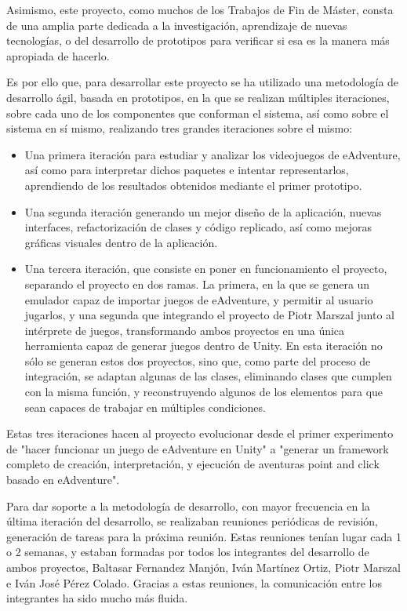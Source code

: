 Asimismo, este proyecto, como muchos de los Trabajos de Fin de Máster, consta de una amplia parte dedicada a la investigación, aprendizaje de nuevas tecnologías, o del desarrollo de prototipos para verificar si esa es la manera más apropiada de hacerlo.

Es por ello que, para desarrollar este proyecto se ha utilizado una metodología de desarrollo ágil, basada en prototipos, en la que se realizan múltiples iteraciones, sobre cada uno de los componentes que conforman el sistema, así como sobre el sistema en sí mismo, realizando tres grandes iteraciones sobre el mismo: 

\begin{itemize}
	\item 
	Una primera iteración para estudiar y analizar los videojuegos de eAdventure, así como para interpretar dichos paquetes e intentar representarlos, aprendiendo de los resultados obtenidos mediante el primer prototipo. 
	\item
	Una segunda iteración generando un mejor diseño de la aplicación, nuevas interfaces, refactorización de clases y código replicado, así como mejoras gráficas visuales dentro de la aplicación.
	\item
	Una tercera iteración, que consiste en poner en funcionamiento el proyecto, separando el proyecto en dos ramas. La primera, en la que se genera un emulador capaz de importar juegos de eAdventure, y permitir al usuario jugarlos, y una segunda que integrando el proyecto de Piotr Marszal junto al intérprete de juegos, transformando ambos proyectos en una única herramienta capaz de generar juegos dentro de Unity. En esta iteración no sólo se generan estos dos proyectos, sino que, como parte del proceso de integración, se adaptan algunas de las clases, eliminando clases que cumplen con la misma función, y reconstruyendo algunos de los elementos para que sean capaces de trabajar en múltiples condiciones.
\end{itemize}

Estas tres iteraciones hacen al proyecto evolucionar desde el primer experimento de "hacer funcionar un juego de eAdventure en Unity" a "generar un framework completo de creación, interpretación, y ejecución de aventuras point and click basado en eAdventure". 

Para dar soporte a la metodología de desarrollo, con mayor frecuencia en la última iteración del desarrollo, se realizaban reuniones periódicas de revisión, generación de tareas para la próxima reunión. Estas reuniones tenían lugar cada 1 o 2 semanas, y estaban formadas por todos los integrantes del desarrollo de ambos proyectos, Baltasar Fernandez Manjón, Iván Martínez Ortiz, Piotr Marszal e Iván José Pérez Colado. Gracias a estas reuniones, la comunicación entre los integrantes ha sido mucho más fluida.